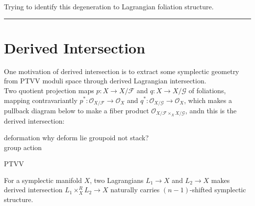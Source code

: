 \documentclass{article}
\begin{document}
\noindent
Trying to identify this degeneration to Lagrangian foliation structure. \\


\vspace{0.5cm}
\noindent\rule{\textwidth}{0.4pt}
\vspace{0.5cm}





\section {Derived Intersection}

\noindent
One motivation of derived intersection is to extract some symplectic geometry from PTVV moduli space through derived Lagrangian intersection. \\





Two quotient projection maps $p:X\to X/\mathcal{F}$ and $q:X\to X/\mathcal{G}$ of foliations, mapping contravariantly
$p^*: \mathcal{O}_{X/\mathcal{F}} \to \mathcal{O}_X$ and $q^*: \mathcal{O}_{X/\mathcal{G}} \to \mathcal{O}_X$,
which makes a pullback diagram below to make a fiber product $\mathcal{O}_{X/\mathcal{F} \times_X X/\mathcal{G}}$, 
andn this is the derived intersection: \\




deformation
why deform lie groupoid not stack? \\

group action \\


\begin{definition}{PTVV}{}
\end{definition}


\begin{definition}{}{}
For a symplectic manifold $X$, two Lagrangians $L_1\to X$ and $L_2\to X$ makes derived intersection
$L_1\times_X^R L_2 \to X$ naturally carries $(n-1)$-shifted symplectic structure.
\end{definition}
\end{document}
